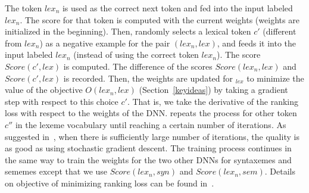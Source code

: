 The token $lex_n$ is used as the correct next token and fed into the
input labeled $lex_n$. The score for that token is computed with the
current weights (weights are initialized in the beginning). Then,
{\tool} randomly selects a lexical token $c'$ (different from $lex_n$)
as a negative example for the pair $(lex_n,lex)$, and feeds it into
the input labeled $lex_n$ (instead of using the correct token
$lex_n$). The score $Score(c',lex)$ is computed. The difference of the
scores $Score(lex_n,lex)$ and $Score(c',lex)$ is recorded. Then, the
weights are updated for $_{lex}$ to minimize the value of
the objective $O(lex_n,lex)$ (Section~\ref{keyideas}) by taking a
gradient step with respect to this choice $c'$. That is, we take the
derivative of the ranking loss with respect to the weights of the DNN.
{\tool} repeats the process for other token $c''$ in the lexeme
vocabulary until reaching a certain number of iterations. As suggested
in~\cite{huang12}, when there is sufficiently large number of
iterations, the quality is as good as using stochastic gradient
descent. The training process continues in the same way to train the
weights for the two other DNNs for syntaxemes and sememes except that
we use $Score(lex_n,syn)$ and $Score(lex_n,sem)$. Details on objective of minimizing ranking loss can be found
in~\cite{collobert08}.





